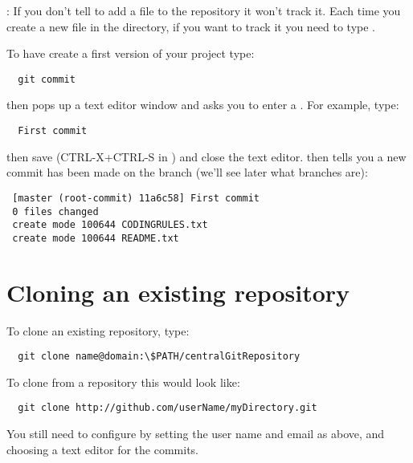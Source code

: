 :
If you don't tell  to add a file to the repository it won't track it.
Each time you create a new file in the directory, if you want  to track it you need to type .

To have  create a first version of your project type:
\begin{lstlisting}
  git commit
\end{lstlisting}
 then pops up a text editor window and asks you to enter a . For example, type:
\begin{lstlisting}
  First commit
\end{lstlisting}
then save (CTRL-X+CTRL-S in ) and close the text editor.
 then tells you a new commit has been made on the branch  (we'll see later what branches are):
\begin{lstlisting}
 [master (root-commit) 11a6c58] First commit
 0 files changed
 create mode 100644 CODINGRULES.txt
 create mode 100644 README.txt

\end{lstlisting}




\section{Cloning an existing  repository}

To clone an existing  repository, type:
\begin{lstlisting}
  git clone name@domain:\$PATH/centralGitRepository
\end{lstlisting}%
To clone from a  repository this would look like:
\begin{lstlisting}
  git clone http://github.com/userName/myDirectory.git
\end{lstlisting}

You still need to configure  by setting the user name and email as above, and choosing a text editor for the commits.

